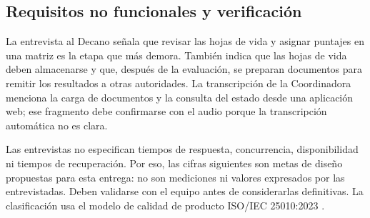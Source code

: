 \subsection{Requisitos no funcionales y verificación}

La entrevista al Decano señala que revisar las hojas de vida y asignar puntajes en una matriz es la etapa que más demora. También indica que las hojas de vida deben almacenarse y que, después de la evaluación, se preparan documentos para remitir los resultados a otras autoridades. La transcripción de la Coordinadora menciona la carga de documentos y la consulta del estado desde una aplicación web; ese fragmento debe confirmarse con el audio porque la transcripción automática no es clara.

Las entrevistas no especifican tiempos de respuesta, concurrencia, disponibilidad ni tiempos de recuperación. Por eso, las cifras siguientes son metas de diseño propuestas para esta entrega: no son mediciones ni valores expresados por las entrevistadas. Deben validarse con el equipo antes de considerarlas definitivas. La clasificación usa el modelo de calidad de producto ISO/IEC 25010:2023 \cite{iso25010_2023}.

